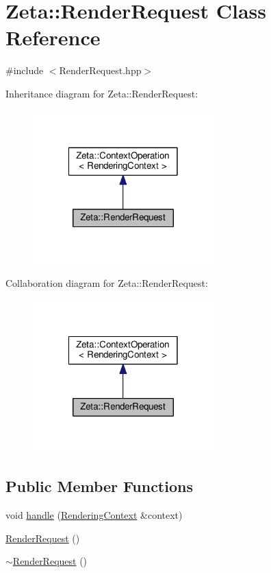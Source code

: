 \hypertarget{classZeta_1_1RenderRequest}{\section{Zeta\+:\+:Render\+Request Class Reference}
\label{classZeta_1_1RenderRequest}
}


{\ttfamily \#include $<$Render\+Request.\+hpp$>$}



Inheritance diagram for Zeta\+:\+:Render\+Request\+:\nopagebreak
\begin{figure}[H]
\begin{center}
\leavevmode
\includegraphics[width=198pt]{classZeta_1_1RenderRequest__inherit__graph}
\end{center}
\end{figure}


Collaboration diagram for Zeta\+:\+:Render\+Request\+:\nopagebreak
\begin{figure}[H]
\begin{center}
\leavevmode
\includegraphics[width=198pt]{classZeta_1_1RenderRequest__coll__graph}
\end{center}
\end{figure}
\subsection*{Public Member Functions}
\begin{DoxyCompactItemize}
\item 
void \hyperlink{classZeta_1_1RenderRequest_ac290a8dbdd74ca0d20016490fb9410bd}{handle} (\hyperlink{classZeta_1_1RenderingContext}{Rendering\+Context} \&context)
\item 
\hyperlink{classZeta_1_1RenderRequest_a016670411d272d35b3e8d4db66ff12a1}{Render\+Request} ()
\item 
\hyperlink{classZeta_1_1RenderRequest_aef68d0ad677bbfbde76b566687768d1e}{$\sim$\+Render\+Request} ()
\end{DoxyCompactItemize}
